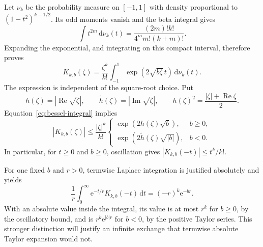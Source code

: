 \documentclass[11pt,a4paper]{article}
\numberwithin{equation}{section}
\theoremstyle{definition}
\theoremstyle{remark}
\theoremstyle{definition}
\newcommand{\e}{\mathrm e}
\newcommand{\dd}{\mathrm d}
\newcommand{\Ree}{\operatorname{Re}}
\newcommand{\Imm}{\operatorname{Im}}
\begin{document}
Let $\nu_k$ be the probability measure on $[-1,1]$ with density
proportional to $(1-t^2)^{k-1/2}$. Its odd moments vanish and the beta
integral gives
\[
 \int t^{2m}\,\dd\nu_k(t)
 =\frac{(2m)!k!}{4^m m!(k+m)!}.
\]
Expanding the exponential, and integrating on this compact interval,
therefore proves
\begin{equation}
 K_{k,b}(\zeta)=\frac{\zeta^k}{k!}
       \int_{-1}^1\exp(2\sqrt{b\zeta}\,t)\,\dd\nu_k(t).
 \label{eq:bessel-integral}
\end{equation}
The expression is independent of the square-root choice. Put
\[
 h(\zeta)=|\Ree\sqrt\zeta|,
 \qquad \widetilde h(\zeta)=|\Imm\sqrt\zeta|,
 \qquad h(\zeta)^2=\frac{|\zeta|+\Ree\zeta}{2}.
\]
Equation~\eqref{eq:bessel-integral} implies
\begin{equation}
 |K_{k,b}(\zeta)|\le\frac{|\zeta|^k}{k!}
 \begin{cases}
  \exp(2h(\zeta)\sqrt b),&b\ge0,\\
  \exp(2\widetilde h(\zeta)\sqrt{|b|}),&b<0.
 \end{cases}
 \label{eq:bessel-bound}
\end{equation}
In particular, for $t\ge0$ and $b\ge0$, oscillation gives
$|K_{k,b}(-t)|\le t^k/k!$.

For one fixed $b$ and $r>0$, termwise Laplace integration is justified
absolutely and yields
\begin{equation}
 \frac1r\int_0^\infty\e^{-t/r}K_{k,b}(-t)\,\dd t
       =(-r)^k\e^{-br}.
 \label{eq:one-block-laplace}
\end{equation}
With an absolute value inside the integral, its value is at most $r^k$
for $b\ge0$, by the oscillatory bound, and is $r^k\e^{|b|r}$ for $b<0$,
by the positive Taylor series. This stronger distinction will justify an
infinite exchange that termwise absolute Taylor expansion would not.
\end{document}

